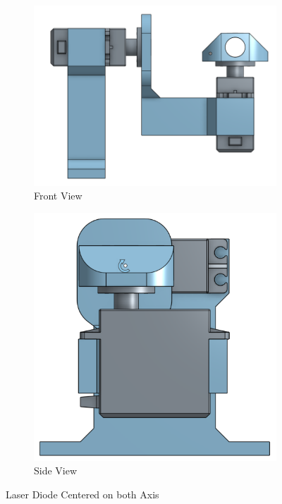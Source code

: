 \documentclass[a4paper,titlepage]{article}
\begin{document}
\begin{figure}[h!]
    \centering
    \begin{subfigure}[b]{0.4\linewidth}
        \includegraphics[width=\linewidth]{gimbal_front.png}
        \caption{Front View}
    \end{subfigure}
    \begin{subfigure}[b]{0.4\linewidth}
        \includegraphics[width=\linewidth]{gimbal_side.png}
        \caption{Side View}
    \end{subfigure}
    \caption{Laser Diode Centered on both Axis}
\end{figure}
\end{document}
